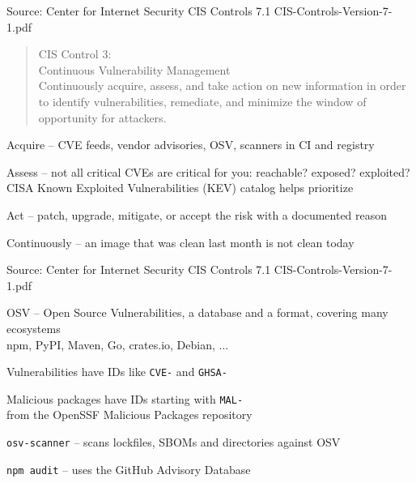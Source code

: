 \documentclass[Screen16to9,17pt]{foils}
\begin{document}
Source: Center for Internet Security CIS Controls 7.1 CIS-Controls-Version-7-1.pdf



\begin{quote}
CIS Control 3:\\
Continuous Vulnerability Management\\
Continuously acquire, assess, and take action on new information in order to identify vulnerabilities, remediate, and minimize the window of opportunity for attackers.
\end{quote}

\begin{list1}
\item Acquire -- CVE feeds, vendor advisories, OSV, scanners in CI and registry
\item Assess -- not all critical CVEs are critical for you: reachable? exposed? exploited?\\
CISA Known Exploited Vulnerabilities (KEV) catalog helps prioritize
\item Act -- patch, upgrade, mitigate, or accept the risk with a documented reason
\item Continuously -- an image that was clean last month is not clean today
\end{list1}

Source: Center for Internet Security CIS Controls 7.1 CIS-Controls-Version-7-1.pdf



\begin{list2}
\item OSV -- Open Source Vulnerabilities, a database and a format, covering many ecosystems\\
npm, PyPI, Maven, Go, crates.io, Debian, ...
\item Vulnerabilities have IDs like \verb+CVE-+ and \verb+GHSA-+
\item Malicious packages have IDs starting with \verb+MAL-+\\
from the OpenSSF Malicious Packages repository
\item \verb+osv-scanner+ -- scans lockfiles, SBOMs and directories against OSV
\item \verb+npm audit+ -- uses the GitHub Advisory Database
\end{list2}

{\footnotesize{}\\
\\
}
\end{document}
